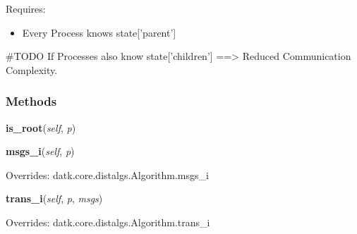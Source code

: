 Requires:

\begin{itemize}
\setlength{\parskip}{0.6ex}
  \item Every Process knows state['parent']

\end{itemize}

\#TODO If Processes also know state['children'] =={\textgreater} Reduced 
Communication Complexity.



  \subsubsection{Methods}

    \label{datk:core:algs:SynchConvergecast:is_root}

    \vspace{0.5ex}

\hspace{.8\funcindent}\begin{boxedminipage}{\funcwidth}

    \raggedright \textbf{is\_root}(\textit{self}, \textit{p})

\setlength{\parskip}{2ex}
\setlength{\parskip}{1ex}
    \end{boxedminipage}

    \vspace{0.5ex}

\hspace{.8\funcindent}\begin{boxedminipage}{\funcwidth}

    \raggedright \textbf{msgs\_i}(\textit{self}, \textit{p})

\setlength{\parskip}{2ex}
\setlength{\parskip}{1ex}
      Overrides: datk.core.distalgs.Algorithm.msgs\_i

    \end{boxedminipage}

    \vspace{0.5ex}

\hspace{.8\funcindent}\begin{boxedminipage}{\funcwidth}

    \raggedright \textbf{trans\_i}(\textit{self}, \textit{p}, \textit{msgs})

\setlength{\parskip}{2ex}
\setlength{\parskip}{1ex}
      Overrides: datk.core.distalgs.Algorithm.trans\_i

    \end{boxedminipage}

